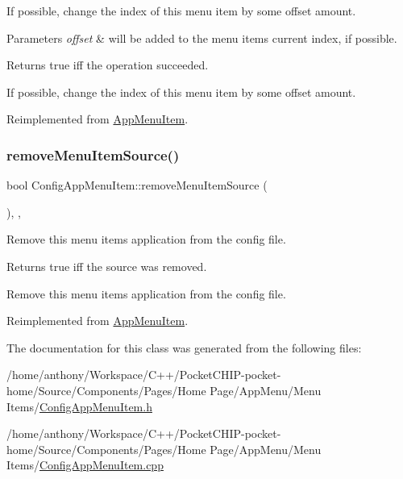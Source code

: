 If possible, change the index of this menu item by some offset amount. 
\begin{DoxyParams}{Parameters}
{\em offset} & will be added to the menu item\textquotesingle{}s current index, if possible. \\
\hline
\end{DoxyParams}
\begin{DoxyReturn}{Returns}
true iff the operation succeeded.
\end{DoxyReturn}
If possible, change the index of this menu item by some offset amount. 

Reimplemented from \mbox{\hyperlink{classAppMenuItem_a66b922c9168e1df29f61ca6e98726d16}{App\+Menu\+Item}}.

\mbox{\label{classConfigAppMenuItem_aa29ddde5f4f5c1e531bde3ea8f4d0ddb}} 
\subsubsection{\texorpdfstring{remove\+Menu\+Item\+Source()}{removeMenuItemSource()}}
{\footnotesize\ttfamily bool Config\+App\+Menu\+Item\+::remove\+Menu\+Item\+Source (\begin{DoxyParamCaption}{ }\end{DoxyParamCaption})\hspace{0.3cm}{\ttfamily [override]}, {\ttfamily [protected]}, {\ttfamily [virtual]}}

Remove this menu item\textquotesingle{}s application from the config file.

\begin{DoxyReturn}{Returns}
true iff the source was removed.
\end{DoxyReturn}
Remove this menu item\textquotesingle{}s application from the config file. 

Reimplemented from \mbox{\hyperlink{classAppMenuItem_a5a156a436279e0319c7960ac2931b14d}{App\+Menu\+Item}}.



The documentation for this class was generated from the following files\+:\begin{DoxyCompactItemize}
\item 
/home/anthony/\+Workspace/\+C++/\+Pocket\+C\+H\+I\+P-\/pocket-\/home/\+Source/\+Components/\+Pages/\+Home Page/\+App\+Menu/\+Menu Items/\mbox{\hyperlink{ConfigAppMenuItem_8h}{Config\+App\+Menu\+Item.\+h}}\item 
/home/anthony/\+Workspace/\+C++/\+Pocket\+C\+H\+I\+P-\/pocket-\/home/\+Source/\+Components/\+Pages/\+Home Page/\+App\+Menu/\+Menu Items/\mbox{\hyperlink{ConfigAppMenuItem_8cpp}{Config\+App\+Menu\+Item.\+cpp}}\end{DoxyCompactItemize}
